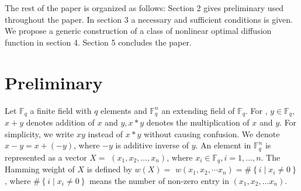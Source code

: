 \documentclass[12pt,a4paper]{article}
\newcommand{\0}{\textbf{0}}
\newcommand{\1}{\textbf{1}}
\begin{document}
    The rest of the paper is organized as follows: Section 2 gives preliminary used throughout the paper. In section 3 a necessary and sufficient conditions is given. We propose a generic construction of a class of nonlinear optimal diffusion function in section 4. Section 5 concludes the paper.
\section{Preliminary}

    Let $\mathbb{F}_{{q}}$ a finite field with $q$ elements and $\mathbb{F}_q^n$ an extending field of $\mathbb{F}_{{q}}$. 
    For , $y \in \mathbb{F}_{{q}}$, $x+y$ denotes addition of $x$ and $y, x * y$ denotes the multiplication of $x$ and $y$. 
    For simplicity, we write $x y$ instead of $x * y$ without causing confusion. 
    We denote $x-y=x+(-y)$, where $-y$ is additive inverse of $y$. 
    An element in $\mathbb{F}_q^n$ is represented as a vector $X=$ $\left(x_{1}, x_{2}, \dots, x_{n}\right)$, where $x_{i} \in \mathbb{F}_{{q}}, i=1, \dots, n$. 
    The Hamming weight of $X$ is defined by $w(X)=$ $w\left(x_{1}, x_{2}, \cdots x_{n}\right)=\#\left\{i \mid x_{i} \neq 0\right\}$, 
    where $\#\left\{i \mid x_{i} \neq 0\right\}$ means the number of non-zero entry in $\left(x_{1}, x_{2}, \dots x_{n}\right)$.
\end{document}
